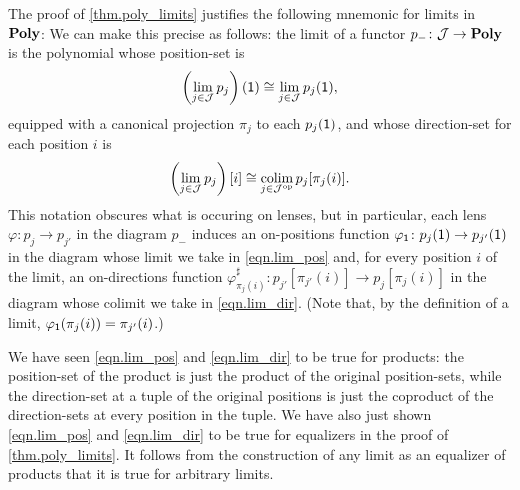 \documentclass[Book-Poly]{subfiles}
\begin{document}
\begin{example} \label{ex.compute_limits}
The proof of \cref{thm.poly_limits} justifies the following mnemonic for limits in $\mathbf{Poly}$:
We can make this precise as follows: the limit of a functor $p_-\colon\mathcal{J}\to\mathbf{Poly}$ is the polynomial whose position-set is
\begin{equation} \label{eqn.lim_pos}
    \left(\lim_{j\in\mathcal{J}} p_j\right)(\textsf{1}) \cong \lim_{j\in\mathcal{J}} p_j(\textsf{1}),
\end{equation}
equipped with a canonical projection $\pi_j$ to each $p_j(\textsf{1})$, and whose direction-set for each position $i$ is
\begin{equation} \label{eqn.lim_dir}
    \left(\lim_{j\in\mathcal{J}} p_j\right)[i] \cong \operatorname*{colim}_{j\in\mathcal{J}^{\textnormal{op}}} p_j[\pi_j(i)].
\end{equation}
This notation obscures what is occuring on lenses, but in particular, each lens $\varphi\colon p_j\to p_{j'}$ in the diagram $p_-$ induces an on-positions function $\varphi_{\textsf{1}}\colon p_j(\textsf{1})\to p_{j'}(\textsf{1})$ in the diagram whose limit we take in \eqref{eqn.lim_pos} and, for every position $i$ of the limit, an on-directions function $\varphi^\sharp_{\pi_j(i)}\colon p_{j'}[\pi_{j'}(i)]\to p_j[\pi_j(i)]$ in the diagram whose colimit we take in \eqref{eqn.lim_dir}.
(Note that, by the definition of a limit, $\varphi_{\textsf{1}}(\pi_j(i)) = \pi_{j'}(i)$.)

We have seen \eqref{eqn.lim_pos} and \eqref{eqn.lim_dir} to be true for products: the position-set of the product is just the product of the original position-sets, while the direction-set at a tuple of the original positions is just the coproduct of the direction-sets at every position in the tuple.
We have also just shown \eqref{eqn.lim_pos} and \eqref{eqn.lim_dir} to be true for equalizers in the proof of \cref{thm.poly_limits}.
It follows from the construction of any limit as an equalizer of products that it is true for arbitrary limits.
\end{example}

\end{document}

